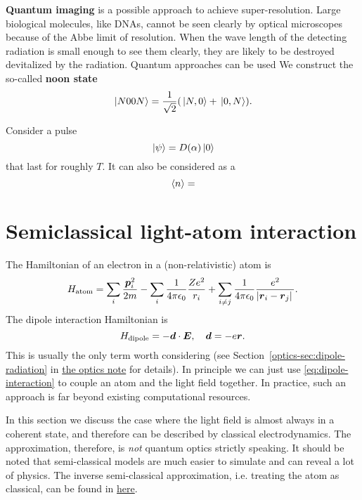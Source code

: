 \documentclass[hyperref, a4paper]{article}
\newcommand*{\concept}[1]{{\textbf{#1}}}
\newcommand{\opticsdoc}{\href{../optics/optics}{the optics note}}
\begin{document}
\concept{Quantum imaging} is a possible approach to achieve super-resolution. 
Large biological molecules, like DNAs, cannot be seen clearly by optical microscopes because of the Abbe limit of resolution.
When the wave length of the detecting radiation is small enough to see them clearly, 
they are likely to be destroyed devitalized by the radiation.
Quantum approaches can be used 
We construct the so-called \concept{noon state}
\begin{equation}
    \ket*{N 00 N} = \frac{1}{\sqrt{2}} (\ket*{N, 0} + \ket*{0, N}).
\end{equation}

Consider a pulse 
\begin{equation}
    \ket*{\psi} = D(\alpha) \ket*{0}
\end{equation}
that last for roughly $T$. It can also be considered as a 
\begin{equation}
    \expval*{n} = 
\end{equation}

\section{Semiclassical light-atom interaction}\label{sec:semi-classical}

The Hamiltonian of an electron in a (non-relativistic) atom is 
\begin{equation}
    H_\text{atom} = \sum_{i} \frac{\vb*{p}_i^2}{2m} - \sum_{i} \frac{1}{4 \pi \epsilon_0} \frac{Z e^2}{r_i} + \sum_{i \neq j} \frac{1}{4 \pi \epsilon_0} \frac{e^2}{\abs*{\vb*{r}_i - \vb*{r}_j}}.
\end{equation}
The dipole interaction Hamiltonian is 
\begin{equation}
    H_\text{dipole} = - \vb*{d} \cdot \vb*{E}, \quad \vb*{d} = - e \vb*{r}.
    \label{eq:dipole-interaction}
\end{equation}
This is usually the only term worth considering (see Section~\ref{optics-sec:dipole-radiation} in \opticsdoc{} for details).
In principle we can just use \eqref{eq:dipole-interaction} to couple an atom and the light field together.
In practice, such an approach is far beyond existing computational resources.

In this section we discuss the case where the light field is almost always in a coherent state, 
and therefore can be described by classical electrodynamics.
The approximation, therefore, is \emph{not} quantum optics strictly speaking.
It should be noted that semi-classical models are much easier to simulate and can reveal a lot of physics.
The inverse semi-classical approximation, i.e. treating the atom as classical, can be found in \href{../quantum-optics-homework/1}{here}.
\end{document}
